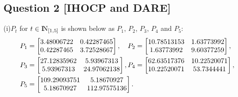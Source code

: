 \documentclass[a4paper,11pt,reqno]{amsart}
\newcommand{\N}{{\rm I\!N}}
\begin{document}
\subsection*{Question 2 [IHOCP and DARE]}\label{sec:q2}
(i)$P_t$ for $t\in\N_{[1,5]}$ is shown below as $P_1$, $P_2$, $P_3$, $P_4$ and $P_5$:
$$\begin{aligned}
    P_1 &=
    \begin{bmatrix}
        3.48006722 & 0.42287465 \\
        0.42287465 & 3.72528667
    \end{bmatrix}, 
    \ \ \ P_2 =
    \begin{bmatrix}
        10.78513153 & 1.63773992 \\
        1.63773992 & 9.60377259
    \end{bmatrix},
    \\
    P_3 &=
    \begin{bmatrix}
        27.12835962 & 5.93967313 \\
        5.93967313 & 24.97062138
    \end{bmatrix}, 
    P_4 =
    \begin{bmatrix}
        62.63517376 & 10.22520071 \\
        10.22520071 & 53.7344441
    \end{bmatrix},
    \\
    P_5 &=
    \begin{bmatrix}
        109.29093751 & 5.18670927 \\
        5.18670927 & 112.97575136
    \end{bmatrix}.
    \notag
\end{aligned}$$
\end{document}
